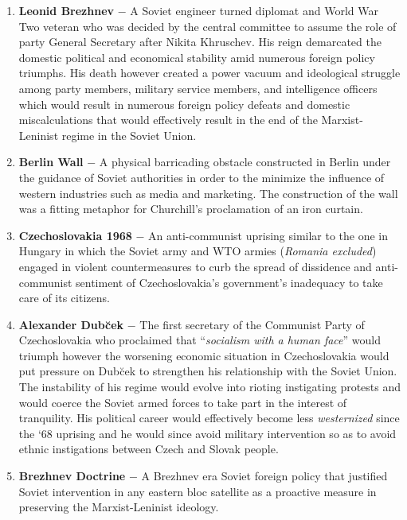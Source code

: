 \documentclass[12pt]{article}
\begin{document}
\begin{flushleft}
\begin{enumerate}
    \item \textbf{Leonid Brezhnev} $-$ A Soviet engineer turned diplomat and World War Two veteran who was decided by the central committee to assume the role of party General Secretary after Nikita Khruschev. His reign demarcated the domestic political and economical stability amid numerous foreign policy triumphs. His death however created a power vacuum and ideological struggle among party members, military service members, and intelligence officers which would result in numerous foreign policy defeats and domestic miscalculations that would effectively result in the end of the Marxist-Leninist regime in the Soviet Union.

    \item \textbf{Berlin Wall} $-$ A physical barricading obstacle constructed in Berlin under the guidance of Soviet authorities in order to the minimize the influence of western industries such as media and marketing. The construction of the wall was a fitting metaphor for Churchill's proclamation of an iron curtain.

    \item \textbf{Czechoslovakia 1968} $-$ An anti-communist uprising similar to the one in Hungary in which the Soviet army and WTO armies (\emph{Romania excluded}) engaged in violent countermeasures to curb the spread of dissidence and anti-communist sentiment of Czechoslovakia's government's inadequacy to take care of its citizens.

    \item \textbf{Alexander Dub\u cek} $-$ The first secretary of the Communist Party of Czechoslovakia who proclaimed that ``\emph{socialism with a human face}'' would triumph however the worsening economic situation in Czechoslovakia would put pressure on Dub\u cek to strengthen his relationship with the Soviet Union. The instability of his regime would evolve into rioting instigating protests and would coerce the Soviet armed forces to take part in the interest of tranquility. His political career would effectively become less \emph{westernized} since the `68 uprising and he would since avoid military intervention so as to avoid ethnic instigations between Czech and Slovak people.

    \item \textbf{Brezhnev Doctrine} $-$ A Brezhnev era Soviet foreign policy that justified Soviet intervention in any eastern bloc satellite as a proactive measure in preserving the Marxist-Leninist ideology.


\end{enumerate}
\end{flushleft}
\end{document}
